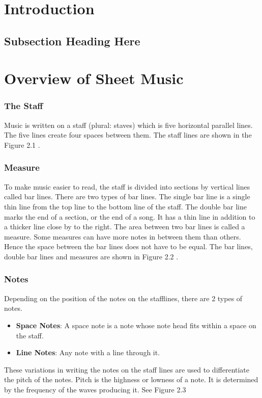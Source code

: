 \documentclass[journal]{IEEEtran}
\begin{document}
%
\IEEEpeerreviewmaketitle



\section{Introduction}

\subsection{Subsection Heading Here}

\section{Overview of Sheet Music}
\subsubsection{The Staff}
Music is written on a staff (plural: staves) which is five horizontal parallel lines. The five lines
create four spaces between them. The staff lines are shown in the Figure 2.1 .

\subsubsection{Measure}
To make music easier to read, the staff is divided into sections by vertical lines called bar lines.
There are two types of bar lines. The single bar line is a single thin line from the top line to the
bottom line of the staff. The double bar line marks the end of a section, or the end of a song. It has
a thin line in addition to a thicker line close by to the right.
The area between two bar lines is called a measure. Some measures can have more notes in
between them than others. Hence the space between the bar lines does not have to be equal. The
bar lines, double bar lines and measures are shown in Figure 2.2 .

\subsubsection{Notes}
Depending on the position of the notes on the stafflines, there are 2 types of notes. 
\begin{itemize}
  \item \textbf{Space Notes}: A space note is a note whose note head fits within a space on the staff.
  \item \textbf{Line Notes}: Any note with a line through it.
\end{itemize}
These variations in writing the notes on the staff lines are used to differentiate the pitch of the
notes. Pitch is the highness or lowness of a note. It is determined by the frequency of the waves
producing it. See Figure 2.3
\end{document}
